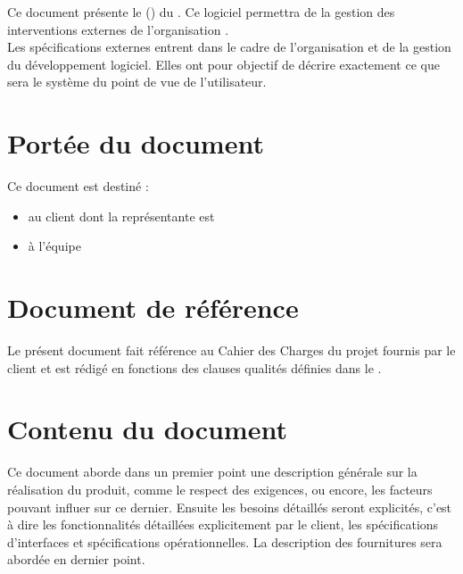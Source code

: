 Ce document présente le \DSE{} (\DSECourt) du \PIC{} \nomPIC. Ce logiciel permettra de la gestion des interventions externes de l'organisation \nomClient. \\
	
	Les spécifications externes entrent dans le cadre de l'organisation et de la gestion du développement logiciel. Elles ont pour objectif de décrire exactement ce que sera le système du point de vue de l'utilisateur.
	
	
\section{Portée du document}
	Ce document est destiné :
	\begin{itemize}
		\item au client \nomClient{} dont la représentante est \representantClient
		\item à l'équipe \PICCourt{} \nomEquipe
	\end{itemize}
	
\section{Document de référence}
	Le présent document fait référence au Cahier des Charges du projet fournis par le client et est rédigé en fonctions des clauses qualités définies dans le \PQ.
	
\section{Contenu du document}
	Ce document aborde dans un premier point une description générale sur la réalisation du produit, comme le respect des exigences, ou encore, les facteurs pouvant influer sur ce dernier. Ensuite les besoins détaillés seront explicités, c'est à dire les fonctionnalités détaillées  explicitement par le client, les spécifications d'interfaces et spécifications opérationnelles. La description des fournitures sera abordée en dernier point.